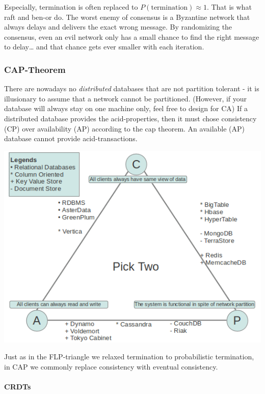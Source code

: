 Especially, termination is often replaced to
\(P(\text{termination}) \approx 1\). That is what raft and ben-or do.
The worst enemy of consensus is a Byzantine network that always delays
and delivers the exact wrong message. By randomizing the consensus, even
an evil network only has a small chance to find the right message to
delay\ldots{} and that chance gets ever smaller with each iteration.

\hypertarget{cap-theorem}{%
\subsubsection{CAP-Theorem}\label{cap-theorem}}

There are nowadays no \emph{distributed} databases that are not
partition tolerant - it is illusionary to assume that a network cannot
be partitioned. (However, if your database will always stay on one
machine only, feel free to design for CA) If a distributed database
provides the acid-properties, then it must chose consistency (CP) over
availability (AP) according to the cap theorem. An available (AP)
database cannot provide acid-transactions.

\includegraphics{images/cap_triangle.png}


Just as in the FLP-triangle we relaxed termination to probabilistic
termination, in CAP we commonly replace consistency with eventual
consistency.

\hypertarget{crdts}{%
\paragraph{CRDTs}\label{crdts}}

